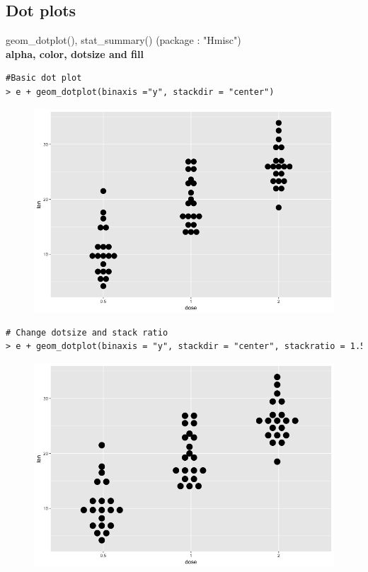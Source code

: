 \subsection{Dot plots}
geom_dotplot(), stat_summary() (package : "Hmisc")\newline
\\
\textbf{alpha, color, dotsize and fill}
\begin{lstlisting}[language=html]
#Basic dot plot
> e + geom_dotplot(binaxis ="y", stackdir = "center")
\end{lstlisting}
\begin{figure}[H]\begin{center}\includegraphics[scale=1 ]{ilu/bg101.png}\end{center}\end{figure}
\begin{lstlisting}[language=html]
# Change dotsize and stack ratio
> e + geom_dotplot(binaxis = "y", stackdir = "center", stackratio = 1.5, dotsize = 1.1)
\end{lstlisting}
\begin{figure}[H]\begin{center}\includegraphics[scale=1 ]{ilu/bg102.png}\end{center}\end{figure}

